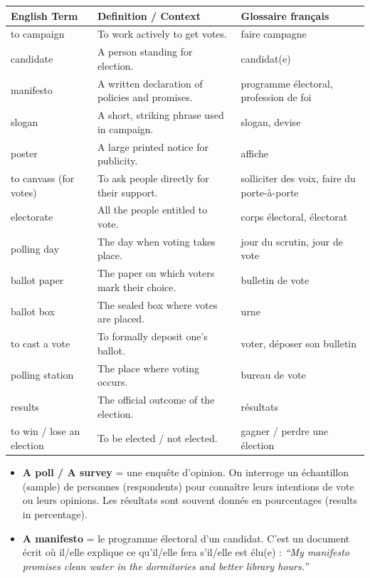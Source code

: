 \documentclass[11pt]{article}
\newcommand{\cle}[1]{{\popxbold\color{popdark}#1}}
\begin{document}
\begin{center}
\begin{tabularx}{\linewidth}{|l|X|X|}
\hline
\rowcolor{popblueL}
\textbf{English Term} & \textbf{Definition / Context} & \textbf{Glossaire français} \\
\hline
\cle{to campaign} & To work actively to get votes. & faire campagne \\
\cle{candidate} & A person standing for election. & candidat(e) \\
\cle{manifesto} & A written declaration of policies and promises. & programme électoral, profession de foi \\
\cle{slogan} & A short, striking phrase used in campaign. & slogan, devise \\
\cle{poster} & A large printed notice for publicity. & affiche \\
\cle{to canvass (for votes)} & To ask people directly for their support. & solliciter des voix, faire du porte-à-porte \\
\cle{electorate} & All the people entitled to vote. & corps électoral, électorat \\
\cle{polling day} & The day when voting takes place. & jour du scrutin, jour de vote \\
\cle{ballot paper} & The paper on which voters mark their choice. & bulletin de vote \\
\cle{ballot box} & The sealed box where votes are placed. & urne \\
\cle{to cast a vote} & To formally deposit one's ballot. & voter, déposer son bulletin \\
\cle{polling station} & The place where voting occurs. & bureau de vote \\
\cle{results} & The official outcome of the election. & résultats \\
\cle{to win / lose an election} & To be elected / not elected. & gagner / perdre une élection \\
\hline
\end{tabularx}
\end{center}

\begin{definition}
\begin{itemize}
\item \textbf{A poll / A survey} = une enquête d'opinion. On interroge un échantillon (\cle{sample}) de personnes (\cle{respondents}) pour connaître leurs intentions de vote ou leurs opinions. Les résultats sont souvent donnés en pourcentages (\cle{results in percentage}).
\item \textbf{A manifesto} = le programme électoral d'un candidat. C'est un document écrit où il/elle explique ce qu'il/elle fera s'il/elle est élu(e) : \emph{``My manifesto promises clean water in the dormitories and better library hours.''}
\end{itemize}
\end{definition}
\end{document}
